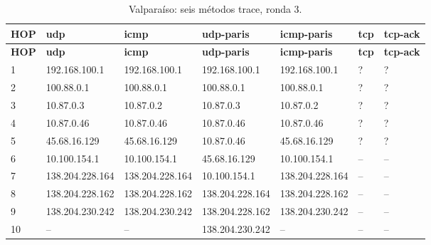 \begin{longtable}{p{0.8cm}p{2.25cm}p{2.25cm}p{2.25cm}p{2.25cm}p{2.25cm}p{2.25cm}}
\caption{Valparaíso: seis métodos trace, ronda 3.}\label{anexo:trace:138.204.230.242:3} \\
\toprule
\textbf{HOP} & \textbf{udp} & \textbf{icmp} & \textbf{udp-paris} & \textbf{icmp-paris} & \textbf{tcp} & \textbf{tcp-ack} \\ \midrule
\endfirsthead
\toprule
\textbf{HOP} & \textbf{udp} & \textbf{icmp} & \textbf{udp-paris} & \textbf{icmp-paris} & \textbf{tcp} & \textbf{tcp-ack} \\ \midrule
\endhead
1 & 192.168.100.1 & 192.168.100.1 & 192.168.100.1 & 192.168.100.1 & ? & ? \\
2 & 100.88.0.1 & 100.88.0.1 & 100.88.0.1 & 100.88.0.1 & ? & ? \\
3 & 10.87.0.3 & 10.87.0.2 & 10.87.0.3 & 10.87.0.2 & ? & ? \\
4 & 10.87.0.46 & 10.87.0.46 & 10.87.0.46 & 10.87.0.46 & ? & ? \\
5 & 45.68.16.129 & 45.68.16.129 & 10.87.0.46 & 45.68.16.129 & ? & ? \\
6 & 10.100.154.1 & 10.100.154.1 & 45.68.16.129 & 10.100.154.1 & -- & -- \\
7 & 138.204.228.164 & 138.204.228.164 & 10.100.154.1 & 138.204.228.164 & -- & -- \\
8 & 138.204.228.162 & 138.204.228.162 & 138.204.228.164 & 138.204.228.162 & -- & -- \\
9 & 138.204.230.242 & 138.204.230.242 & 138.204.228.162 & 138.204.230.242 & -- & -- \\
10 & -- & -- & 138.204.230.242 & -- & -- & -- \\
\bottomrule
\end{longtable}
\endgroup
\begingroup
\fontsize{9}{11}\selectfont
